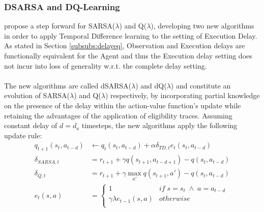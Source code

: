             \subsubsection{DSARSA and DQ-Learning}
                 propose a step forward for SARSA($\lambda$) and Q($\lambda$), developing two new algorithms in order to apply Temporal Difference learning to the setting of Execution Delay. As stated in Section \ref{subsubs:delayeq}, Observation and Execution delays are functionally equivalent for the Agent and thus the Execution delay setting does not incur into loss of generality w.r.t. the complete delay setting. 
                \\\\
                The new algorithms are called dSARSA($\lambda$) and dQ($\lambda$) and constitute an evolution of SARSA($\lambda$) and Q($\lambda$) respectively, by incorporating partial knowledge on the presence of the delay within the action-value function's update while retaining the advantages of the application of eligibility traces. Assuming constant delay of $d = d_a$ timesteps, the new algorithms apply the following update rule:
                \begin{align*}
                    q_{t+1}(s_t, a_{t-d}) &\leftarrow q_{t}(s_t, a_{t-d}) + \alpha \delta_{TD, t} e_t(s_t, a_{t-d})\\
                    \delta_{SARSA, t}    &= r_{t+1} + \gamma q(s_{t+1}, a_{t-d+1}) - q(s_t, a_{t-d})\\
                    \delta_{Q, t}        &= r_{t+1} + \gamma \max_{a'} q(s_{t+1}, a') - q(s_t, a_{t-d})\\
                    e_{t}(s,a) &= 
                            \begin{cases} 
                                1 & if \; s = s_t \; \wedge \; a = a_{t-d} \\
                                \gamma \lambda e_{t-1}(s, a) & otherwise \\ 
                            \end{cases}
                \end{align*}
                
